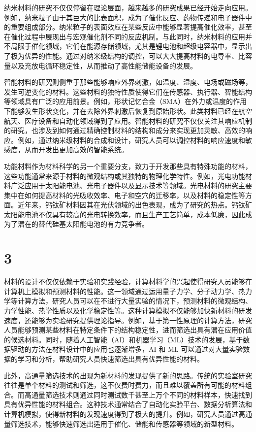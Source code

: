 \begin{multicols}{2}
纳米材料的研究不仅仅停留在理论层面，越来越多的研究成果已经开始走向应用。例如，纳米粒子由于其巨大的比表面积，成为了催化反应、药物传递和电子器件中的重要组成部分。纳米粒子的表面效应在某些反应中能够显著提高催化效率，甚至在催化过程中展现出与宏观催化剂不同的反应机制。与此同时，纳米材料的应用并不局限于催化领域，它们在能源存储领域，尤其是锂电池和超级电容器中，显示出了极为优异的性能。通过对纳米级结构的调控，可以大大提高材料的电导率、比容量以及充放电循环稳定性，从而推动了高性能储能设备的发展。

智能材料的研究则侧重于那些能够响应外界刺激，如温度、湿度、电场或磁场等，发生可逆变化的材料。这些材料的独特性质使得它们在传感器、执行器、智能结构等领域具有广泛的应用前景。例如，形状记忆合金（SMA）在外力或温度的作用下能够发生形状变化，并在去除外界刺激后恢复到原始形状。此类材料已经在航空航天、医疗设备和自动化领域得到了应用。智能材料的研究不仅仅关注其响应机制的研究，也涉及到如何通过精确控制材料的结构和成分来实现更加灵敏、高效的响应。例如，通过纳米级材料的合成和设计，研究人员可以调控材料的响应速度和敏感度，从而开发出更加高效的智能系统。

功能材料作为材料科学的另一个重要分支，致力于开发那些具有特殊功能的材料，这些功能通常来源于材料的微观结构或其独特的物理化学特性。例如，光电功能材料广泛应用于太阳能电池、光电子器件以及显示技术等领域。光电材料的研究主要集中在如何提高材料的光吸收效率、电子和空穴的迁移率，以及材料的稳定性等方面。近年来，钙钛矿材料因其在光伏领域的出色表现，成为了研究的热点。钙钛矿太阳能电池不仅具有较高的光电转换效率，而且生产工艺简单，成本低廉，因此成为了潜在的替代硅基太阳能电池的有力竞争者。

\section{3}
材料的设计不仅仅依赖于实验和实践经验，计算材料学的兴起使得研究人员能够在计算机上模拟和预测材料的性能。这一领域通过运用量子力学、分子动力学、热力学等计算方法，研究人员可以在不进行大量实验的情况下，预测材料的微观结构、力学性能、热学性质以及化学稳定性等。这种计算模拟不仅能够加快新材料的研发速度，还能够为实验研究提供理论指导。例如，基于第一性原理的计算方法，研究人员能够预测某些材料在特定条件下的结构稳定性，进而筛选出具有潜在应用价值的候选材料。同时，随着人工智能（AI）和机器学习（ML）技术的发展，基于数据驱动的方法在材料设计中的应用也逐渐增多，AI 和 ML 可以通过对大量实验数据的学习和分析，帮助研究人员快速筛选出具有优异性能的材料。

此外，高通量筛选技术的出现为新材料的发现提供了新的思路。传统的实验室研究往往是单个材料的测试和筛选，这不仅费时费力，而且难以覆盖所有可能的材料组合。而高通量筛选技术则通过同时测试数千甚至上万个不同的材料样本，快速找到具有优异性能的材料组合。这种技术通常结合了自动化实验平台、数据分析算法和计算机模拟，使得新材料的发现速度得到了极大的提升。例如，研究人员通过高通量筛选技术，能够快速筛选出适用于催化、储能和传感器等领域的新型材料。


\end{multicols}
